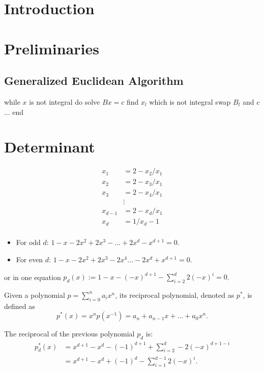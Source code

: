 \documentclass[english,version-2020-11]{uzl-thesis}
\begin{document}
\chapter{Introduction}

\chapter{Preliminaries}

\section{Generalized Euclidean Algorithm}

\begin{Pseudocode}
while $x$ is not integral do
  solve $Bx = c$
  find $x_l$ which is not integral
  swap $B_l$ and $c$
  ...
end
\end{Pseudocode}

\chapter{Determinant}

\begin{align*}
  x_1     & = 2 - x_2 / x_1 \\
  x_2     & = 2 - x_3 / x_1 \\
  x_3     & = 2 - x_4 / x_1 \\
          & \vdots          \\
  x_{d-1} & = 2 - x_d / x_1 \\
  x_d     & = 1 / x_d - 1   \\
\end{align*}

\begin{itemize}
  \item For odd $d$: $1 - x - 2 x^2 + 2 x^3 - \dots + 2 x^d - x^{d+1} = 0$.
  \item For even $d$: $1 - x - 2 x^2 + 2 x^3 - 2 x^4 \dots - 2 x^d + x^{d+1} = 0$.
\end{itemize}
or in one equation $p_d(x) := 1 - x - (-x)^{d+1} - \sum_{i = 2}^{d} 2 (-x)^{i} = 0$.

\begin{definition}
  Given a polynomial $p = \sum_{i=0}^n a_i x^n$, its reciprocal polynomial,
  denoted as $p^*$, is defined as
  \[
    p^*(x) = x^n p(x^{-1}) = a_n + a_{n-1} x + \dots + a_0 x^n.
  \]
\end{definition}

\begin{example}
  The reciprocal of the previous polynomial $p_d$ is:
  \begin{align*}
    p_d^*(x) & = x^{d+1} - x^d - (-1)^{d+1} + \sum_{i = 2}^{d} -2 (-x)^{d + 1 - i} \\
             & = x^{d+1} - x^d + (-1)^d - \sum_{i = 1}^{d - 1} 2 (-x)^i.
  \end{align*}
\end{example}
\end{document}
